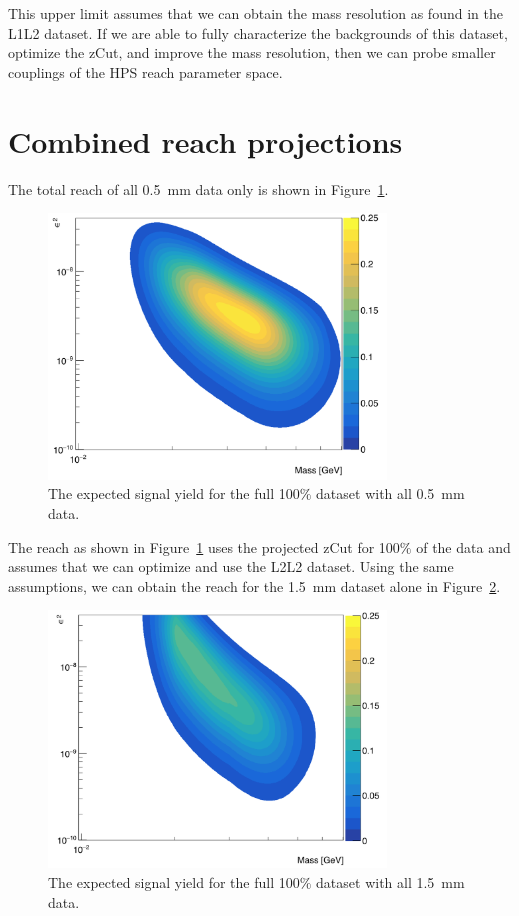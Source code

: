 \documentclass[twoside]{article}
\begin{document}
This upper limit assumes that we can obtain the mass resolution as found in the L1L2 dataset. If we are able to fully characterize the backgrounds of this dataset, optimize the zCut, and improve the mass resolution, then we can probe smaller couplings of the HPS reach parameter space. 

\section{Combined reach projections}

The total reach of all 0.5~mm data only is shown in Figure~\ref{fig:reach0p5only}.

\begin{figure}[H]
  \centering
     \includegraphics[width=0.8\textwidth]{plots/reachall_0p5.png}
  \caption{The expected signal yield for the full 100$\%$ dataset with all 0.5~mm data.}
  \label{fig:reach0p5only}
\end{figure} 

The reach as shown in Figure~\ref{fig:reach0p5only} uses the projected zCut for 100$\%$ of the data and assumes that we can optimize and use the L2L2 dataset. Using the same assumptions, we can obtain the reach for the 1.5~mm dataset alone in Figure~\ref{fig:reach1p5only}.

\begin{figure}[H]
  \centering
     \includegraphics[width=0.8\textwidth]{plots/reachall_1p5.png}
  \caption{The expected signal yield for the full 100$\%$ dataset with all 1.5~mm data.}
  \label{fig:reach1p5only}
\end{figure} 
\end{document}

